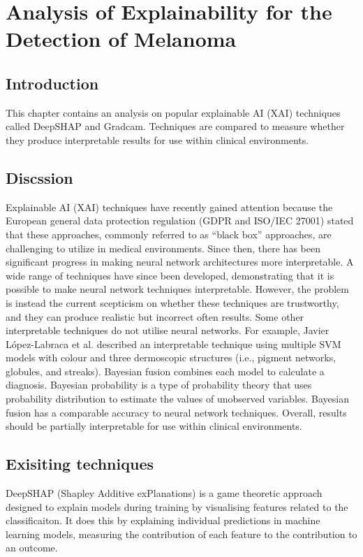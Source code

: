 \chapter{Analysis of Explainability for the Detection of Melanoma}

\section{Introduction}
This chapter contains an analysis on popular explainable AI (XAI) techniques called DeepSHAP and Gradcam. Techniques are compared to measure whether they produce interpretable results for use within clinical environments. 

\section{Discssion}
Explainable AI (XAI) techniques have recently gained attention because the European general data protection regulation (GDPR and ISO/IEC 27001) stated that these approaches, commonly referred to as ``black box'' approaches, are challenging to utilize in medical environments. Since then, there has been significant progress in making neural network architectures more interpretable. A wide range of techniques\cite{Fuji2019,  Selvaraju2016, Ribeiro2016} have since been developed, demonstrating that it is possible to make neural network techniques interpretable. However, the problem is instead the current scepticism on whether these techniques are trustworthy\cite{Tjoa2019, Samek2019a}, and they can produce realistic but incorrect often results\cite{Ghorbani2019}. Some other interpretable techniques do not utilise neural networks. For example, Javier López-Labraca et al.\cite{Lopez-Labraca2018} described an interpretable technique using multiple SVM models with colour and three dermoscopic structures (i.e., pigment networks, globules, and streaks). Bayesian fusion combines each model to calculate a diagnosis. Bayesian probability is a type of probability theory that uses probability distribution to estimate the values of unobserved variables. Bayesian fusion has a comparable accuracy to neural network techniques\cite{Takruri2017}. Overall, results should be partially interpretable for use within clinical environments.


\section{Exisiting techniques}
DeepSHAP (Shapley Additive exPlanations) is a game theoretic approach designed to explain models during training by visualising features related to the classificaiton. It does this by explaining individual predictions in machine learning models, measuring the contribution of each feature to the contribution to an outcome\cite{Aas2021}.

